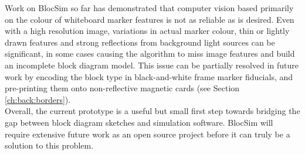 Work on BlocSim so far has demonstrated that computer vision based primarily on the colour of whiteboard marker features is not as reliable as is desired. Even with a high resolution image, variations in actual marker colour, thin or lightly drawn features and strong reflections from background light sources can be significant, in some cases causing the algorithm to miss image features and build an incomplete block diagram model. This issue can be partially resolved in future work by encoding the block type in black-and-white frame marker fiducials, and pre-printing them onto non-reflective magnetic cards (see Section \ref{ch:back:borders}).
\\

Overall, the current prototype is a useful but small first step towards bridging the gap between block diagram sketches and simulation software. BlocSim will require extensive future work as an open source project before it can truly be a solution to this problem.


\begin{comment}

\end{comment}
